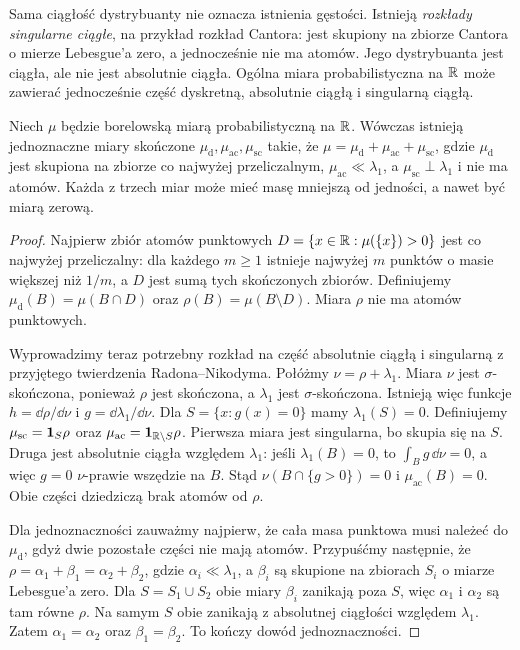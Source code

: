 \begin{uwaga}
Sama ciągłość dystrybuanty nie oznacza istnienia gęstości.
Istnieją \emph{rozkłady singularne ciągłe}, na przykład rozkład
Cantora: jest skupiony na zbiorze Cantora o mierze Lebesgue'a zero,
a jednocześnie nie ma atomów. Jego dystrybuanta jest ciągła,
ale nie jest absolutnie ciągła. Ogólna miara probabilistyczna na $\mathbb{R}$
może zawierać jednocześnie część dyskretną, absolutnie ciągłą
i singularną ciągłą.
\end{uwaga}


\begin{twierdzenie}
Niech $\mu$ będzie borelowską miarą probabilistyczną na $\mathbb{R}$.
Wówczas istnieją jednoznaczne miary skończone
$\mu_{\mathrm d},\mu_{\mathrm{ac}},\mu_{\mathrm{sc}}$
takie, że $\mu=\mu_{\mathrm d}+\mu_{\mathrm{ac}}+
\mu_{\mathrm{sc}}$, gdzie $\mu_{\mathrm d}$ jest skupiona
na zbiorze co najwyżej przeliczalnym,
$\mu_{\mathrm{ac}}\ll\lambda_1$,
a $\mu_{\mathrm{sc}}\perp\lambda_1$ i nie ma atomów.
Każda z trzech miar może mieć masę mniejszą od jedności,
a nawet być miarą zerową.
\end{twierdzenie}
\begin{proof}
Najpierw zbiór atomów punktowych
$D=\{x\in\mathbb{R}:\mu(\{x\})>0\}$ jest co najwyżej
przeliczalny: dla każdego $m\geq1$ istnieje najwyżej
$m$ punktów o masie większej niż $1/m$, a
$D$ jest sumą tych skończonych zbiorów.
Definiujemy $\mu_{\mathrm d}(B)=\mu(B\cap D)$
oraz $\rho(B)=\mu(B\setminus D)$. Miara $\rho$
nie ma atomów punktowych.

Wyprowadzimy teraz potrzebny rozkład na część absolutnie
ciągłą i singularną z przyjętego twierdzenia
Radona--Nikodyma. Połóżmy $\nu=\rho+\lambda_1$.
Miara $\nu$ jest $\sigma$-skończona, ponieważ
$\rho$ jest skończona, a $\lambda_1$ jest
$\sigma$-skończona. Istnieją więc funkcje
$h=\dd\rho/\dd\nu$ i $g=\dd\lambda_1/\dd\nu$.
Dla $S=\{x:g(x)=0\}$ mamy $\lambda_1(S)=0$.
Definiujemy $\mu_{\mathrm{sc}}=\mathbf{1}_{S}\rho$ oraz
$\mu_{\mathrm{ac}}=\mathbf{1}_{\mathbb{R}\setminus S}\rho$.
Pierwsza miara jest singularna, bo skupia się na $S$.
Druga jest absolutnie ciągła względem $\lambda_1$:
jeśli $\lambda_1(B)=0$, to
$\int_B g\,\dd\nu=0$, a więc $g=0$
$\nu$-prawie wszędzie na $B$. Stąd
$\nu(B\cap\{g>0\})=0$ i
$\mu_{\mathrm{ac}}(B)=0$.
Obie części dziedziczą brak atomów od $\rho$.

Dla jednoznaczności zauważmy najpierw, że cała
masa punktowa musi należeć do $\mu_{\mathrm d}$,
gdyż dwie pozostałe części nie mają atomów.
Przypuśćmy następnie, że
$\rho=\alpha_1+\beta_1=\alpha_2+\beta_2$,
gdzie $\alpha_i\ll\lambda_1$, a $\beta_i$
są skupione na zbiorach $S_i$ o miarze Lebesgue'a zero.
Dla $S=S_1\cup S_2$ obie miary $\beta_i$
zanikają poza $S$, więc $\alpha_1$ i $\alpha_2$
są tam równe $\rho$. Na samym $S$ obie zanikają
z absolutnej ciągłości względem $\lambda_1$.
Zatem $\alpha_1=\alpha_2$ oraz
$\beta_1=\beta_2$. To kończy dowód jednoznaczności.
\end{proof}

